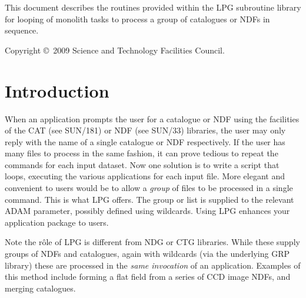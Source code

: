 \documentclass[twoside,11pt]{article}
\newcommand{\stardocinitials}  {SUN}
\newcommand{\stardoccopyright}
{Copyright \copyright\ 2009 Science and Technology Facilities Council.}
\newcommand{\stardocnumber}    {263.1}
\newcommand{\stardocabstract}  {
This document describes the routines provided within the LPG subroutine
library for looping of monolith tasks to process a group of catalogues or NDFs
in sequence.
}
\newcommand{\stardocname}{\stardocinitials /\stardocnumber}
\newenvironment{latexonly}{}{}
\newcommand{\xref}[3]{#1}
\renewcommand{\_}{\texttt{\symbol{95}}}
\renewcommand{\thepage}{\roman{page}}
\begin{document}
\stardocabstract

\begin{latexonly}
\newpage
\vspace*{\fill}
\stardoccopyright
\end{latexonly}

  \newpage
  \begin{latexonly}
    \setlength{\parskip}{0mm}
    \tableofcontents
    \setlength{\parskip}{\medskipamount}
    \markboth{\stardocname}{\stardocname}
  \end{latexonly}

\cleardoublepage
\renewcommand{\thepage}{\arabic{page}}
\setcounter{page}{1}

\section {Introduction}

When an application prompts the user for a catalogue or NDF using the
facilities of the CAT (see \xref{SUN/181}{sun181}{}) or NDF (see
\xref{SUN/33}{sun33}{}) libraries, the user may only reply with the
name of a single catalogue or NDF respectively.  If the user has many
files to process in the same fashion, it can prove tedious to repeat
the commands for each input dataset.  Now one solution is to write a
script that loops, executing the various applications for each input
file.  More elegant and convenient to users would be to allow a
\emph{group} of files to be processed in a single command.  This is
what LPG offers.  The group or list is supplied to the relevant ADAM
parameter, possibly defined using wildcards.  Using LPG enhances your
application package to users.

Note the r\^{o}le of LPG is different from \xref{NDG}{sun2}{} or
\xref{CTG}{sun262}{} libraries.  While these supply groups of NDFs and
catalogues, again with wildcards (via the underlying
\xref{GRP}{sun150}{} library) these are processed in the \emph{same
invocation} of an application. Examples of this method include forming
a flat field from a series of CCD image NDFs, and merging catalogues.
\end{document}
